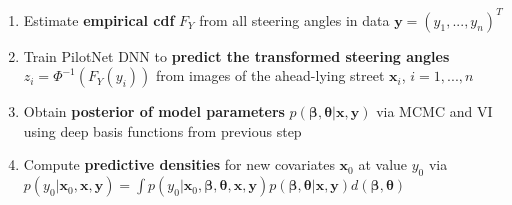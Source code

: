 \documentclass[preview]{standalone}
\begin{document}
\begin{center}
\selectfont
        \begin{enumerate}
        \item Estimate \textbf{empirical cdf} $F_Y$ from all steering angles in data $\boldsymbol{y}= (y_1,...,y_n)^T$
        \item Train PilotNet DNN to \textbf{predict the transformed steering angles} $z_i = \Phi^{-1}(F_Y(y_i))$ from images of the ahead-lying street $\boldsymbol{x}_i$, $i = 1,...,n$
        \item Obtain \textbf{posterior of model parameters} $p(\boldsymbol{\beta}, \boldsymbol{\theta}|  \boldsymbol{x}, \boldsymbol{y})$ via MCMC and VI using deep basis functions from previous step
        \item Compute \textbf{predictive densities} for new covariates $\boldsymbol{x}_0$ at value $y_0$ via $p(y_0 | \boldsymbol{x}_0, \boldsymbol{x}, \boldsymbol{y}) = \int p(y_0 | \boldsymbol{x}_0, \boldsymbol{\beta}, \boldsymbol{\theta}, \boldsymbol{x}, \boldsymbol{y})p(\boldsymbol{\beta}, \boldsymbol{\theta}| \boldsymbol{x}, \boldsymbol{y})d(\boldsymbol{\beta}, \boldsymbol{\theta})$
        \end{enumerate}
\end{center}
\end{document}

